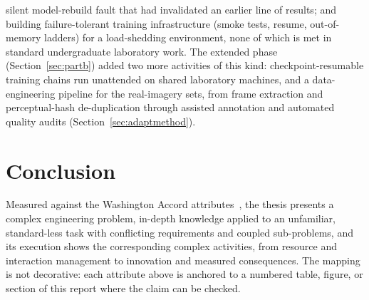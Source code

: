 \begin{itemize}
        silent model-rebuild fault that had invalidated an earlier line of
        results; and building failure-tolerant training infrastructure
        (smoke tests, resume, out-of-memory ladders) for a load-shedding
        environment, none of which is met in standard undergraduate
        laboratory work. The extended phase (Section~\ref{sec:partb}) added
        two more activities of this kind: checkpoint-resumable training
        chains run unattended on shared laboratory machines, and a
        data-engineering pipeline for the real-imagery sets, from frame
        extraction and perceptual-hash de-duplication through assisted
        annotation and automated quality audits
        (Section~\ref{sec:adaptmethod}).
\end{itemize}

\section{Conclusion}
Measured against the Washington Accord attributes~\cite{iea2021gapc}, the
thesis presents a complex engineering problem, in-depth knowledge applied to
an unfamiliar, standard-less task with conflicting requirements and coupled
sub-problems, and its execution shows the corresponding complex activities,
from resource and interaction management to innovation and measured
consequences. The mapping is not decorative: each attribute above is
anchored to a numbered table, figure, or section of this report where the
claim can be checked.
